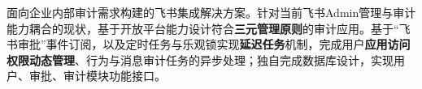 \documentclass{resume}
\begin{document}
  \begin{onehalfspacing}
    面向企业内部审计需求构建的飞书集成解决方案。针对当前飞书Admin管理与审计能力耦合的现状，基于开放平台能力设计符合\textbf{三元管理原则}的审计应用。基于“飞书审批”事件订阅，以及定时任务与乐观锁实现\textbf{延迟任务}机制，完成用户\textbf{应用访问权限动态管理}、行为与消息审计任务的异步处理；独自完成数据库设计，实现用户、审批、审计模块功能接口。
  \end{onehalfspacing}


\end{document}

